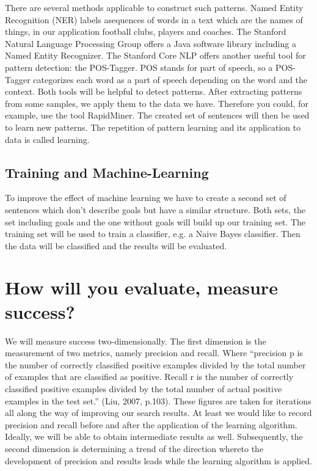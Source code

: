 \documentclass[11pt,titlepage,oneside,openany]{book}
\begin{document}
There are several methods applicable to construct such patterns. Named Entity Recognition (NER) labels asequences of words in a text which are the names of things, in our application football clubs, players and coaches. The Stanford Natural Language Processing Group offers a Java software library including a Named Entity Recognizer. The Stanford Core NLP offers another useful tool for pattern detection: the POS-Tagger. POS stands for part of speech, so a POS-Tagger categorizes each word as a part of speech depending on the word and the context. Both tools will be helpful to detect patterns.
After extracting patterns from some samples, we apply them to the data we have. Therefore you could, for example, use the tool RapidMiner. The created set of sentences will then be used to learn new patterns. The  repetition of pattern learning and its application to data is called learning.

\subsection{Training and Machine-Learning}
To improve the effect of machine learning we have to create a second set of sentences which don’t describe goals but have a similar structure. 
Both sets, the set including goals and the one without goals will build up our training set. The training set will be used to train a classifier, e.g. a Naive Bayes classifier. Then the data will be classified and the results will be evaluated.

\section{How will you evaluate, measure success?}

We will measure success two-dimensionally. The first dimension is the measurement of two metrics, namely precision and recall. Where “precision p is the number of correctly classified positive examples divided by the total number of examples that are classified as positive. Recall r is the number of correctly classified positive examples divided by the total number of actual positive examples in the test set.” (Liu, 2007, p.103). These figures are taken for iterations all along the way of improving our search results. At least we would like to record precision and recall before and after the application of the learning algorithm. Ideally, we will be able to obtain intermediate results as well. Subsequently, the second dimension is determining a trend of the direction whereto the development of precision and results leads while the learning algorithm is applied.
\end{document}
